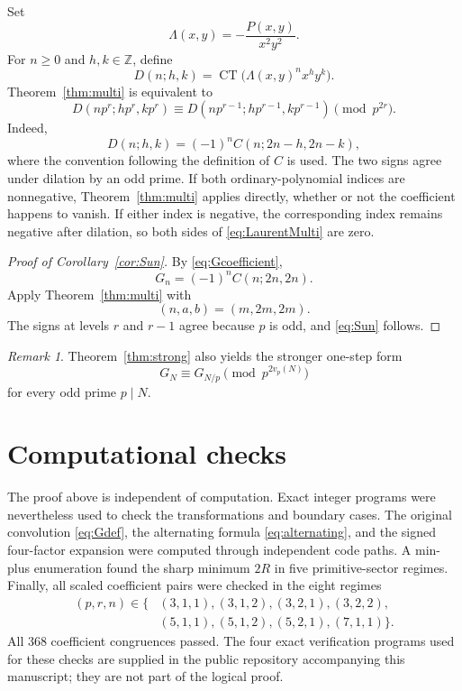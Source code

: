 \documentclass[11pt,reqno]{amsart}
\numberwithin{equation}{section}
\theoremstyle{remark}
\newtheorem{remark}[theorem]{Remark}
\newcommand{\Z}{\mathbb Z}
\newcommand{\vp}{v_p}
\newcommand{\CT}{\operatorname {CT}}
\begin{document}
Set
\[
\Lambda(x,y)=-\frac{P(x,y)}{x^2y^2}.
\]
For \(n\geq0\) and \(h,k\in\Z\), define
\[
D(n;h,k)=\CT\bigl(\Lambda(x,y)^n x^hy^k\bigr).
\]
Theorem~\ref{thm:multi} is equivalent to
\begin{equation}\label{eq:LaurentMulti}
D(np^r;hp^r,kp^r)
\equiv D(np^{r-1};hp^{r-1},kp^{r-1})
\pmod {p^{2r}}.
\end{equation}
Indeed,
\[
D(n;h,k)=(-1)^nC(n;2n-h,2n-k),
\]
where the convention following the definition of \(C\) is used.  The two
signs agree under dilation by an odd prime.  If both ordinary-polynomial
indices are nonnegative, Theorem~\ref{thm:multi} applies directly, whether
or not the coefficient happens to vanish.  If either index is negative,
the corresponding index remains negative after dilation, so both sides of
\eqref{eq:LaurentMulti} are zero.

\begin{proof}[Proof of Corollary~\ref{cor:Sun}]
By \eqref{eq:Gcoefficient},
\[
G_n=(-1)^nC(n;2n,2n).
\]
Apply Theorem~\ref{thm:multi} with
\[
(n,a,b)=(m,2m,2m).
\]
The signs at levels \(r\) and \(r-1\) agree because \(p\) is odd, and
\eqref{eq:Sun} follows.
\end{proof}

\begin{remark}
Theorem~\ref{thm:strong} also yields the stronger one-step form
\[
G_N\equiv G_{N/p}\pmod {p^{2\vp(N)}}
\]
for every odd prime \(p\mid N\).
\end{remark}

\section{Computational checks}

The proof above is independent of computation.  Exact integer programs were
nevertheless used to check the transformations and boundary cases.
The original convolution \eqref{eq:Gdef}, the alternating formula
\eqref{eq:alternating}, and the signed four-factor expansion were computed
through independent code paths.  A min-plus enumeration found the sharp
minimum \(2R\) in five primitive-sector regimes.  Finally, all scaled
coefficient pairs were checked in the eight regimes
\[
\begin{split}
(p,r,n)\in\{&(3,1,1),(3,1,2),(3,2,1),(3,2,2),\\
&(5,1,1),(5,1,2),(5,2,1),(7,1,1)\}.
\end{split}
\]
All 368 coefficient congruences passed.
The four exact verification programs used for these checks are supplied in
the public repository accompanying this manuscript; they are not part of the
logical proof.
\end{document}
